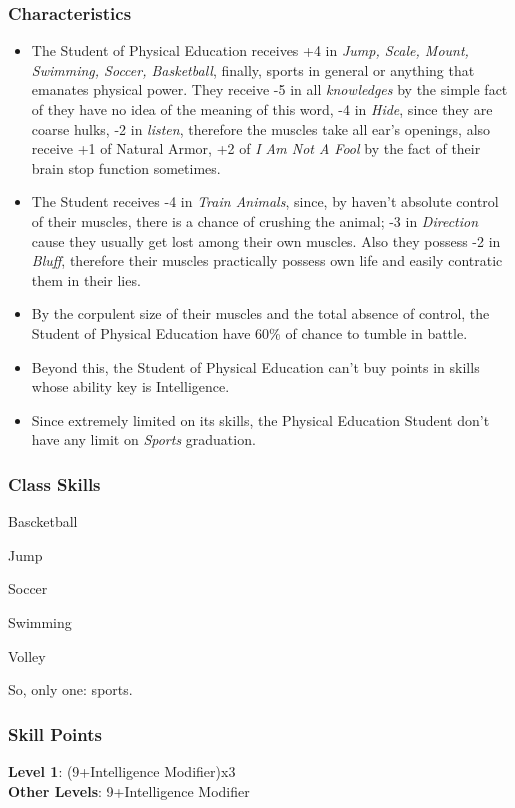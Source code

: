 \documentclass[ letterpaper,12pt]{article}
\begin{document}
\subsubsection{Characteristics}
\begin{itemize}
\item{The   Student   of   Physical   Education receives  +4  in  {\it Jump,   Scale,   Mount, Swimming,  Soccer,  Basketball},  finally, sports  in  general  or   anything that emanates physical power. They receive -5 in all {\it knowledges} by the simple fact of they have no idea of the meaning of this word, -4 in {\it Hide}, since they are coarse hulks, -2 in {\it listen}, therefore  the muscles take all ear's openings, also receive +1 of Natural Armor, +2 of {\it I Am Not A Fool} by the fact of their brain stop function sometimes.}
\item{The  Student  receives  -4 in {\it Train Animals}, since, by haven't absolute control of their muscles,  there  is  a chance of crushing the animal; -3 in {\it Direction} cause they usually get lost among their own muscles. Also  they possess -2 in {\it Bluff}, therefore their muscles practically possess own life and easily contratic them in their lies.}
\item{By  the  corpulent size of their muscles and the total absence of control, the Student of Physical Education have 60\% of chance to tumble in battle.}
\item{Beyond this, the Student of Physical Education can't buy points in skills whose ability key is Intelligence.}
\item{Since extremely limited on its skills, the Physical Education Student don't have any limit on {\it Sports} graduation.}
\end{itemize}

\subsubsection{Class Skills}
\begin{itemize}
{\it 
\item{Bascketball}
\item{Jump}
\item{Soccer}
\item{Swimming}
\item{Volley}
\item{So, only one: sports.}
}
\end{itemize}

\subsubsection{Skill Points}
{\bf Level 1}: (9+Intelligence Modifier)x3\\
{\bf Other Levels}: 9+Intelligence Modifier\\
\end{document}
